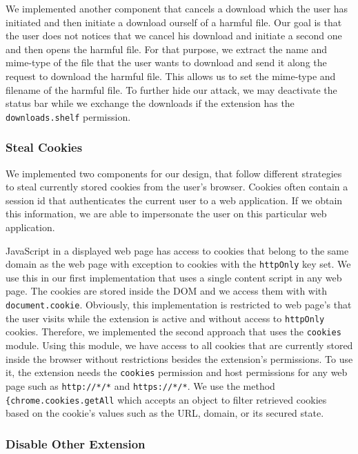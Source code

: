 	We implemented another component that cancels a download which the user has initiated and then initiate a download ourself of a harmful file. Our goal is that the user does not notices that we cancel his download and initiate a second one and then opens the harmful file. For that purpose, we extract the name and mime-type of the file that the user wants to download and send it along the request to download the harmful file. This allows us to set the mime-type and filename of the harmful file. To further hide our attack, we may deactivate the status bar while we exchange the downloads if the extension has the \texttt{downloads.shelf} permission. \\

\subsubsection{Steal Cookies}
\label{sec:stealCookies}

	We implemented two components for our design, that follow different strategies to steal currently stored cookies from the user's browser. Cookies often contain a session id that authenticates the current user to a web application. If we obtain this information, we are able to impersonate the user on this particular web application. 
	
	JavaScript in a displayed web page has access to cookies that belong to the same domain as the web page with exception to cookies with the \texttt{httpOnly} key set. We use this in our first implementation that uses a single content script in any web page. The cookies are stored inside the DOM and we access them with with \texttt{document.cookie}. Obviously, this implementation is restricted to web page's that the user visits while the extension is active and without access to \texttt{httpOnly} cookies. Therefore, we implemented the second approach that uses the \texttt{cookies} module. Using this module, we have access to all cookies that are currently stored inside the browser without restrictions besides the extension's permissions. To use it, the extension needs the \texttt{cookies} permission and host permissions for any web page such as \texttt{http://*/*} and \texttt{https://*/*}. We use the method \lstinline|{chrome.cookies.getAll| which accepts an object to filter retrieved cookies based on the cookie's values such as the URL, domain, or its secured state.

\subsubsection{Disable Other Extension}
\label{sec:disableOtherExtension}

